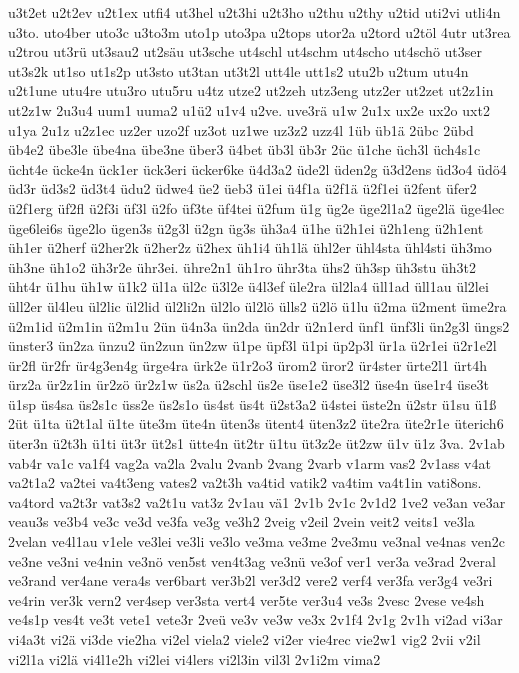 {u3t2et
u2t2ev
u2t1ex
utfi4
ut3hel
u2t3hi
u2t3ho
u2thu
u2thy
u2tid
uti2vi
utli4n
u3to.
uto4ber
uto3c
u3to3m
uto1p
uto3pa
u2tops
utor2a
u2tord
u2töl
4utr
ut3rea
u2trou
ut3rü
ut3sau2
ut2säu
ut3sche
ut4schl
ut4schm
ut4scho
ut4schö
ut3ser
ut3s2k
ut1so
ut1s2p
ut3sto
ut3tan
ut3t2l
utt4le
utt1s2
utu2b
u2tum
utu4n
u2t1une
utu4re
utu3ro
utu5ru
u4tz
utze2
ut2zeh
utz3eng
utz2er
ut2zet
ut2z1in
ut2z1w
2u3u4
uum1
uuma2
u1ü2
u1v4
u2ve.
uve3rä
u1w
2u1x
ux2e
ux2o
uxt2
u1ya
2u1z
u2z1ec
uz2er
uzo2f
uz3ot
uz1we
uz3z2
uzz4l
1üb
üb1ä
2übc
2übd
üb4e2
übe3le
übe4na
übe3ne
über3
ü4bet
üb3l
üb3r
2üc
ü1che
üch3l
üch4s1c
ücht4e
ücke4n
ück1er
ück3eri
ücker6ke
ü4d3a2
üde2l
üden2g
ü3d2ens
üd3o4
üdö4
üd3r
üd3s2
üd3t4
üdu2
üdwe4
üe2
üeb3
ü1ei
ü4f1a
ü2f1ä
ü2f1ei
ü2fent
üfer2
ü2f1erg
üf2fl
ü2f3i
üf3l
ü2fo
üf3te
üf4tei
ü2fum
ü1g
üg2e
üge2l1a2
üge2lä
üge4lec
üge6lei6s
üge2lo
ügen3s
ü2g3l
ü2gn
üg3s
üh3a4
ü1he
ü2h1ei
ü2h1eng
ü2h1ent
üh1er
ü2herf
ü2her2k
ü2her2z
ü2hex
üh1i4
üh1lä
ühl2er
ühl4sta
ühl4sti
üh3mo
üh3ne
üh1o2
üh3r2e
ühr3ei.
ühre2n1
üh1ro
ühr3ta
ühs2
üh3sp
üh3stu
üh3t2
üht4r
ü1hu
üh1w
ü1k2
ül1a
ül2c
ü3l2e
ü4l3ef
üle2ra
ül2la4
üll1ad
üll1au
ül2lei
üll2er
ül4leu
ül2lic
ül2lid
ül2li2n
ül2lo
ül2lö
ülls2
ü2lö
ü1lu
ü2ma
ü2ment
üme2ra
ü2m1id
ü2m1in
ü2m1u
2ün
ü4n3a
ün2da
ün2dr
ü2n1erd
ünf1
ünf3li
ün2g3l
üngs2
ünster3
ün2za
ünzu2
ün2zun
ün2zw
ü1pe
üpf3l
ü1pi
üp2p3l
ür1a
ü2r1ei
ü2r1e2l
ür2fl
ür2fr
ür4g3en4g
ürge4ra
ürk2e
ü1r2o3
ürom2
üror2
ür4ster
ürte2l1
ürt4h
ürz2a
ür2z1in
ür2zö
ür2z1w
üs2a
ü2schl
üs2e
üse1e2
üse3l2
üse4n
üse1r4
üse3t
ü1sp
üs4sa
üs2s1c
üss2e
üs2s1o
üs4st
üs4t
ü2st3a2
ü4stei
üste2n
ü2str
ü1su
ü1ß
2üt
ü1ta
ü2t1al
ü1te
üte3m
üte4n
üten3s
ütent4
üten3z2
üte2ra
üte2r1e
üterich6
üter3n
ü2t3h
ü1ti
üt3r
üt2s1
ütte4n
üt2tr
ü1tu
üt3z2e
üt2zw
ü1v
ü1z
3va.
2v1ab
vab4r
va1c
va1f4
vag2a
va2la
2valu
2vanb
2vang
2varb
v1arm
vas2
2v1ass
v4at
va2t1a2
va2tei
va4t3eng
vates2
va2t3h
va4tid
vatik2
va4tim
va4t1in
vati8ons.
va4tord
va2t3r
vat3s2
va2t1u
vat3z
2v1au
vä1
2v1b
2v1c
2v1d2
1ve2
ve3an
ve3ar
veau3s
ve3b4
ve3c
ve3d
ve3fa
ve3g
ve3h2
2veig
v2eil
2vein
veit2
veits1
ve3la
2velan
ve4l1au
v1ele
ve3lei
ve3li
ve3lo
ve3ma
ve3me
2ve3mu
ve3nal
ve4nas
ven2c
ve3ne
ve3ni
ve4nin
ve3nö
ven5st
ven4t3ag
ve3nü
ve3of
ver1
ver3a
ve3rad
2veral
ve3rand
ver4ane
vera4s
ver6bart
ver3b2l
ver3d2
vere2
verf4
ver3fa
ver3g4
ve3ri
ve4rin
ver3k
vern2
ver4sep
ver3sta
vert4
ver5te
ver3u4
ve3s
2vesc
2vese
ve4sh
ve4s1p
ves4t
ve3t
vete1
vete3r
2veü
ve3v
ve3w
ve3x
2v1f4
2v1g
2v1h
vi2ad
vi3ar
vi4a3t
vi2ä
vi3de
vie2ha
vi2el
viela2
viele2
vi2er
vie4rec
vie2w1
vig2
2vii
v2il
vi2l1a
vi2lä
vi4l1e2h
vi2lei
vi4lers
vi2l3in
vil3l
2v1i2m
vima2
}
